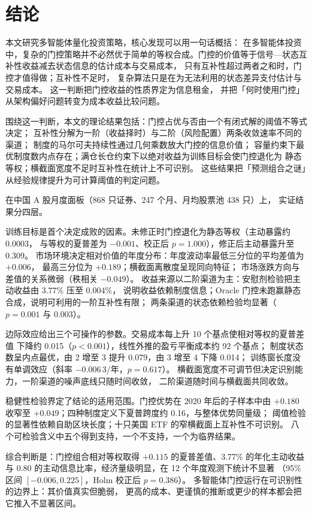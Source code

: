 \section{结论}
\label{sec:conclusion}

本文研究多智能体量化投资策略，核心发现可以用一句话概括：
在多智能体投资中，复杂的门控策略并不必然优于简单的等权合成。门控的价值等于信号—状态互补性收益减去状态信息的估计成本与交易成本，
只有互补性超过两者之和时，门控才值得做；互补性不足时，
复杂算法只是在为无法利用的状态差异支付估计与交易成本。
这一判断把门控收益的性质界定为信息租金，
并把「何时使用门控」从架构偏好问题转变为成本收益比较问题。

围绕这一判断，本文的理论结果包括：门控占优与否由一个有闭式解的阈值不等式决定；
互补性分解为一阶（收益择时）与二阶（风险配置）两条收敛速率不同的渠道；
制度的马尔可夫持续性通过几何乘数放大门控的信息价值；
容量约束下最优制度数内点存在；满仓长仓约束下以绝对收益为训练目标会使门控退化为
静态等权；横截面宽度不足时互补性在统计上不可识别。
这些结果把「预测组合之谜」从经验规律提升为可计算阈值的判定问题。

在中国 A 股月度面板（868 只证券、247 个月、月均股票池 438 只）上，
实证结果分四层。

训练目标是首个决定成败的因素。未修正时门控退化为静态等权（主动暴露约 $0.0003$，
与等权的夏普差为 $-0.001$、校正后 $p=1.000$），修正后主动暴露升至 0.309。
市场环境决定相对价值的年度分布：年度波动率最低三分位的平均差值为 $+0.006$，
最高三分位为 $+0.189$；横截面离散度呈现同向特征；
市场涨跌方向与差值的关系微弱（秩相关 $-0.049$）。
收益来源以二阶渠道为主：安慰剂检验把主动收益由 $3.77\%$ 压至 $0.004\%$，
说明收益依赖制度信息；Oracle 门控未跑赢静态合成，说明可利用的一阶互补性有限；
两条渠道的状态依赖检验均显著（$p=0.001$ 与 $0.003$）。

边际效应给出三个可操作的参数。交易成本每上升 10 个基点使相对等权的夏普差值
下降约 0.015（$p<0.001$），线性外推的盈亏平衡成本约 92 个基点；
制度状态数呈内点最优，由 2 增至 3 提升 0.079，由 3 增至 4 下降 0.014；
训练窗长度没有单调效应（斜率 $-0.006\,3$/年，$p=0.617$）。
横截面宽度不可调节但决定识别能力，一阶渠道的噪声底线只随时间收敛，
二阶渠道随时间与横截面共同收敛。

稳健性检验界定了结论的适用范围。门控优势在 2020 年后的子样本中由 $+0.180$
收窄至 $+0.049$；四种制度定义下夏普跨度约 0.16，与整体优势同量级；
阈值检验的显著性依赖自助区块长度；十只美国 ETF 的窄横截面上互补性不可识别。
八个可检验含义中五个得到支持，一个不支持，一个为临界结果。

综合判断是：门控组合相对等权取得 $+0.115$ 的夏普差值、3.77\% 的年化主动收益
与 0.80 的主动信息比率，经济量级明显，在 12 个年度观测下统计不显著
（95\% 区间 $[-0.006,0.225]$，Holm 校正后 $p=0.386$）。
多智能体门控运行在可识别性的边界上：其价值真实但脆弱，
更高的成本、更谨慎的推断或更少的样本都会把它推入不显著区间。

